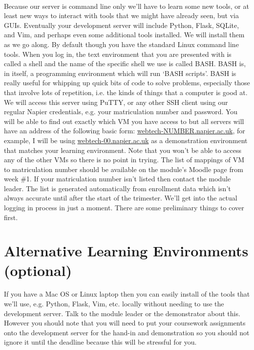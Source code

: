 \documentclass[12pt, a4paper, oneside]{book}
\begin{document}
\paragraph{} Because our server is command line only we'll have to learn some new tools, or at least new ways to interact with tools that we might have already seen, but via GUIs. Eventually your development server will include Python, Flask, SQLite, and Vim, and perhaps even some additional tools installed. We will install them as we go along. By default though you have the standard Linux command line tools. When you log in, the text environment that you are presented with is called a shell and the name of the specific shell we use is called BASH. BASH is, in itself, a programming environment which will run `BASH scripts'. BASH is really useful for whipping up quick bits of code to solve problems, especially those that involve lots of repetition, i.e. the kinds of things that a computer is good at. We will access this server using PuTTY, or any other SSH client using our regular Napier credentials, e.g. your matriculation number and password. You will be able to find out exactly which VM you have access to but all servers will have an address of the following basic form: \url{webtech-NUMBER.napier.ac.uk}, for example, I will be using  \url{webtech-00.napier.ac.uk} as a demonstration environment that matches your learning environment. Note that you won't be able to access any of the other VMs so there is no point in trying. The list of mappings of VM to matriculation number should be available on the module's Moodle page from week \#1. If your matriculation number isn't listed then contact the module leader. The list is generated automatically from enrollment data which isn't always accurate until after the start of the trimester. We'll get into the actual logging in process in just a moment. There are some preliminary things to cover first.

\section{Alternative Learning Environments (optional)}
\label{alternatives}
\paragraph{} If you have a Mac OS or Linux laptop then you can easily install of the tools that we'll use, e.g. Python, Flask, Vim, etc. locally without needing to use the development server. Talk to the module leader or the demonstrator about this. However you should note that you will need to put your coursework assignments onto the development server for the hand-in and demonstration so you should not ignore it until the deadline because this will be stressful for you.
\end{document}
